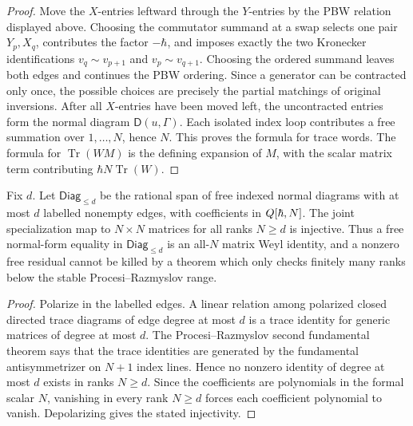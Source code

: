 \begin{proof}
  Move the \(X\)-entries leftward through the \(Y\)-entries by the PBW
  relation displayed above.  Choosing the commutator summand at a swap
  selects one pair \(Y_p,X_q\), contributes the factor \(-\hbar\), and
  imposes exactly the two Kronecker identifications
  \(v_q\sim v_{p+1}\) and \(v_p\sim v_{q+1}\).  Choosing the ordered
  summand leaves both edges and continues the PBW ordering.  Since a
  generator can be contracted only once, the possible choices are
  precisely the partial matchings of original inversions.  After all
  \(X\)-entries have been moved left, the uncontracted entries form the
  normal diagram \(\mathsf D(u,\Gamma)\).  Each isolated index loop
  contributes a free summation over \(1,\ldots,N\), hence \(N\).  This
  proves the formula for trace words.  The formula for
  \(\operatorname{Tr}(W M)\) is the defining expansion of \(M\), with the
  scalar matrix term contributing \(\hbar N\operatorname{Tr}(W)\).
\end{proof}

\begin{lem}
\label{lem:app-free-trace-diagram-stable-injectivity}
  Fix \(d\).  Let \(\mathsf{Diag}_{\le d}\) be the rational span of free
  indexed normal diagrams with at most \(d\) labelled nonempty edges,
  with coefficients in \(Q[\hbar,N]\).  The joint specialization map
  to \(N\times N\) matrices for all ranks \(N\ge d\) is injective.  Thus
  a free normal-form equality in \(\mathsf{Diag}_{\le d}\) is an all-\(N\)
  matrix Weyl identity, and a nonzero free residual cannot be killed by
  a theorem which only checks finitely many ranks below the stable
  Procesi--Razmyslov range.
\end{lem}

\begin{proof}
  Polarize in the labelled edges.  A linear relation among polarized
  closed directed trace diagrams of edge degree at most \(d\) is a trace
  identity for generic matrices of degree at most \(d\).  The
  Procesi--Razmyslov second fundamental theorem says that the trace
  identities are generated by the fundamental antisymmetrizer on
  \(N+1\) index lines.  Hence no nonzero identity of degree at most
  \(d\) exists in ranks \(N\ge d\).  Since the coefficients are
  polynomials in the formal scalar \(N\), vanishing in every rank
  \(N\ge d\) forces each coefficient polynomial to vanish.  Depolarizing
  gives the stated injectivity.
\end{proof}

